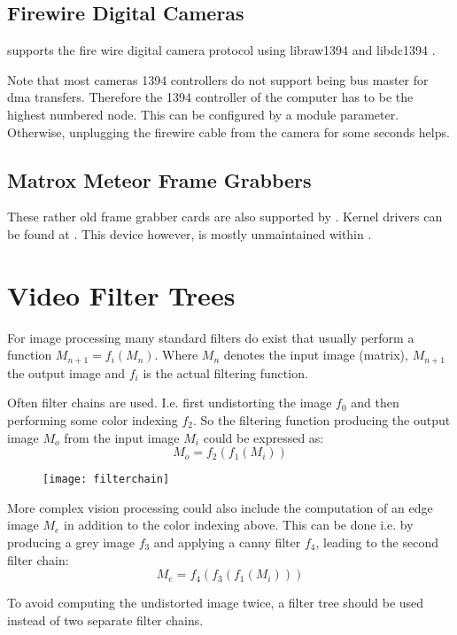 \subsection{Firewire Digital Cameras}

\miro supports the fire wire digital camera protocol using
libraw1394\cite{} and libdc1394 \cite{}.
  
Note that most cameras 1394 controllers do not support being bus
master for dma transfers. Therefore the 1394 controller of the
computer has to be the highest numbered node. This can be configured
by a module parameter. Otherwise, unplugging the firewire cable from
the camera for some seconds helps.

\subsection{Matrox Meteor Frame Grabbers}

These rather old frame grabber cards are also supported by \miro.
Kernel drivers can be found at \cite{}. This device however, is mostly
unmaintained within \miro.

\section{Video Filter Trees}

For image processing many standard filters do exist that usually
perform a function $M_{n+1} = f_i(M_{n})$. Where $M_n$ denotes the input
image (matrix), $M_{n+1}$ the output image and $f_i$ is the actual
filtering function. 

Often filter chains are used. I.e. first undistorting
the image $f_0$ and then performing some color indexing $f_2$. So the
filtering function producing the output image $M_o$ from the input
image $M_i$ could be expressed as:  $$M_o = f_2(f_1(M_i))$$

\begin{figure}[!ht]
  \begin{center}
    \texttt{[image: filterchain]}
  \end{center}
\end{figure}

More complex vision processing could also include the computation of
an edge image $M_e$ in addition to the color indexing above. This can
be done i.e. by producing a grey image $f_3$ and applying a canny
filter $f_4$, leading to the second filter chain: 
$$M_e = f_4(f_3(f_1(M_i)))$$

To avoid computing the undistorted image twice, a filter tree should
be used instead of two separate filter chains.


